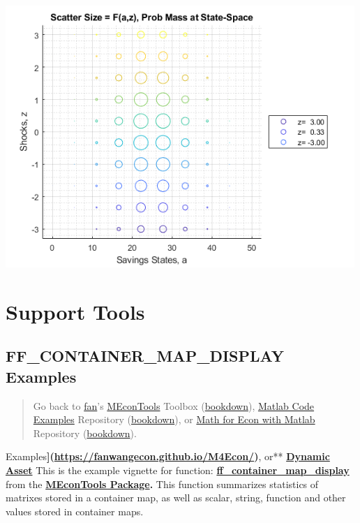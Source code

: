 \documentclass[
]{book}
\begin{document}
\includegraphics[width=5.20833in,height=\textheight]{img/fx_graph_grid_images/figure_8.png}

\hypertarget{support-tools}{%
\chapter{Support Tools}\label{support-tools}}

\hypertarget{ff_container_map_display-examples}{%
\section{FF\_CONTAINER\_MAP\_DISPLAY Examples}\label{ff_container_map_display-examples}}

\begin{quote}
Go back to \href{http://fanwangecon.github.io/}{fan}'s \href{https://fanwangecon.github.io/MEconTools/}{MEconTools} Toolbox (\href{https://fanwangecon.github.io/MEconTools/bookdown}{bookdown}), \href{https://fanwangecon.github.io/M4Econ/}{Matlab Code Examples} Repository (\href{https://fanwangecon.github.io/M4Econ/bookdown}{bookdown}), or \href{https://fanwangecon.github.io/Math4Econ/}{Math for Econ with Matlab} Repository (\href{https://fanwangecon.github.io/Math4Econ/bookdown}{bookdown}).
\end{quote}

Examples\textbf{{]}(\url{https://fanwangecon.github.io/M4Econ/})}, or** \href{https://fanwangecon.github.io/CodeDynaAsset/}{\textbf{Dynamic
Asset}}
This is the example vignette for function:
\href{https://github.com/FanWangEcon/MEconTools/blob/master/MEconTools/tools/ff_container_map_display.m}{\textbf{ff\_container\_map\_display}}
from the \href{https://fanwangecon.github.io/MEconTools/}{\textbf{MEconTools
Package}}\textbf{.} This function
summarizes statistics of matrixes stored in a container map, as well as
scalar, string, function and other values stored in container maps.
\end{document}
